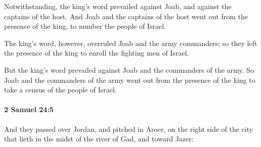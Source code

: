 			\begin{versebox}
					\item[BHS] 
					\item[ASV] Notwithstanding, the king's word prevailed against Joab, and against the captains of the host. And Joab and the captains of the host went out from the presence of the king, to number the people of Israel.
					\item[NIV] The king’s word, however, overruled Joab and the army commanders; so they left the presence of the king to enroll the fighting men of Israel.
					\item[NRSV] But the king’s word prevailed against Joab and the commanders of the army. So Joab and the commanders of the army went out from the presence of the king to take a census of the people of Israel.
			\end{versebox}

		\paragraph{2 Samuel 24:5} %
			\label{2SAMUEL-24-5}

			And they passed over Jordan, and pitched in Aroer, on the right side of the city that lieth in the midst of the river of Gad, and toward Jazer:

